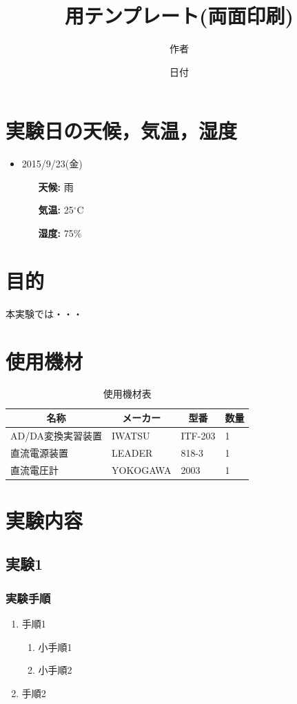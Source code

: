 \documentclass[10.5pt,twoside]{jsarticle}
\title{\LaTeXe 用テンプレート(両面印刷)}
\date{日付}
\author{作者}
\begin{document}
\maketitle
\thispagestyle{fancy}

\section{実験日の天候，気温，湿度}
\begin{itemize}
	\item{2015/9/23(金)}
		\begin{itemize}
			\item[\textbf{天候:}]{雨}
			\item[\textbf{気温:}]{25$^\circ$C}
			\item[\textbf{湿度:}]{75\%}
		\end{itemize}
\end{itemize}

\section{目的}
本実験では・・・

\section{使用機材}
\begin{table}[H]
	\centering
	\caption{使用機材表} \label{Equipments}
	\begin{tabular}{|l|l|l|l|} 
		\hline
		\multicolumn{1}{|c|}{\textbf{名称}}&\multicolumn{1}{c|}{\textbf{メーカー}}&\multicolumn{1}{c|}{\textbf{型番}}&\multicolumn{1}{c|}{\textbf{数量}}\\\hline\hline
		AD/DA変換実習装置&IWATSU&ITF-203&1\\\hline
		直流電源装置&LEADER&818-3&1\\\hline
		直流電圧計&YOKOGAWA&2003&1\\\hline
	\end{tabular}
\end{table}

\newpage

\section{実験内容}
\subsection{実験1}
\subsubsection{実験手順}
\begin{enumerate}
\item{手順1}
	\begin{enumerate}
		\item{小手順1}
		\item{小手順2}
	\end{enumerate}
\item{手順2}
\end{enumerate}
\end{document}

